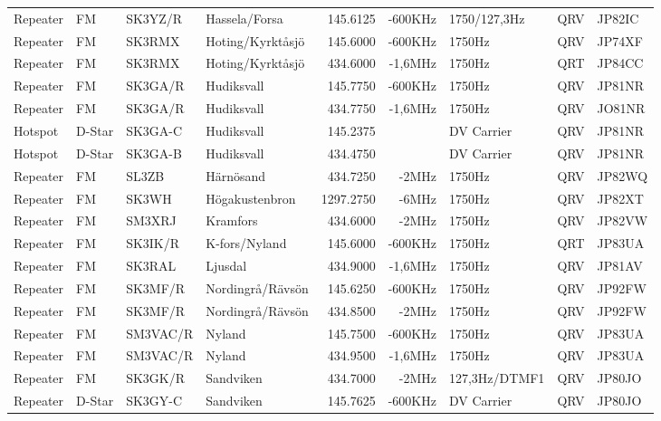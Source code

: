 \begin{longtable}{llllrrlcl}
Repeater & FM     & SK3YZ/R  & Hassela/Forsa    & 145.6125  & -600KHz  & 1750/127,3Hz  & QRV & JP82IC \\
Repeater & FM     & SK3RMX   & Hoting/Kyrktåsjö & 145.6000  & -600KHz  & 1750Hz        & QRV & JP74XF \\
Repeater & FM     & SK3RMX   & Hoting/Kyrktåsjö & 434.6000  & -1,6MHz  & 1750Hz        & QRT & JP84CC \\
Repeater & FM     & SK3GA/R  & Hudiksvall       & 145.7750  & -600KHz  & 1750Hz        & QRV & JP81NR \\
Repeater & FM     & SK3GA/R  & Hudiksvall       & 434.7750  & -1,6MHz  & 1750Hz        & QRV & JO81NR \\
Hotspot  & D-Star & SK3GA-C  & Hudiksvall       & 145.2375  &          & DV Carrier    & QRV & JP81NR \\
Hotspot  & D-Star & SK3GA-B  & Hudiksvall       & 434.4750  &          & DV Carrier    & QRV & JP81NR \\
Repeater & FM     & SL3ZB    & Härnösand        & 434.7250  & -2MHz    & 1750Hz        & QRV & JP82WQ \\
Repeater & FM     & SK3WH    & Högakustenbron   & 1297.2750 & -6MHz    & 1750Hz        & QRV & JP82XT \\
Repeater & FM     & SM3XRJ   & Kramfors         & 434.6000  & -2MHz    & 1750Hz        & QRV & JP82VW \\
Repeater & FM     & SK3IK/R  & K-fors/Nyland    & 145.6000  & -600KHz  & 1750Hz        & QRT & JP83UA \\
Repeater & FM     & SK3RAL   & Ljusdal          & 434.9000  & -1,6MHz  & 1750Hz        & QRV & JP81AV \\
Repeater & FM     & SK3MF/R  & Nordingrå/Rävsön & 145.6250  & -600KHz  & 1750Hz        & QRV & JP92FW \\
Repeater & FM     & SK3MF/R  & Nordingrå/Rävsön & 434.8500  & -2MHz    & 1750Hz        & QRV & JP92FW \\
Repeater & FM     & SM3VAC/R & Nyland           & 145.7500  & -600KHz  & 1750Hz        & QRV & JP83UA \\
Repeater & FM     & SM3VAC/R & Nyland           & 434.9500  & -1,6MHz  & 1750Hz        & QRV & JP83UA \\
Repeater & FM     & SK3GK/R  & Sandviken        & 434.7000  & -2MHz    & 127,3Hz/DTMF1 & QRV & JP80JO \\
Repeater & D-Star & SK3GY-C  & Sandviken        & 145.7625  & -600KHz  & DV Carrier    & QRV & JP80JO \\

\end{longtable}
